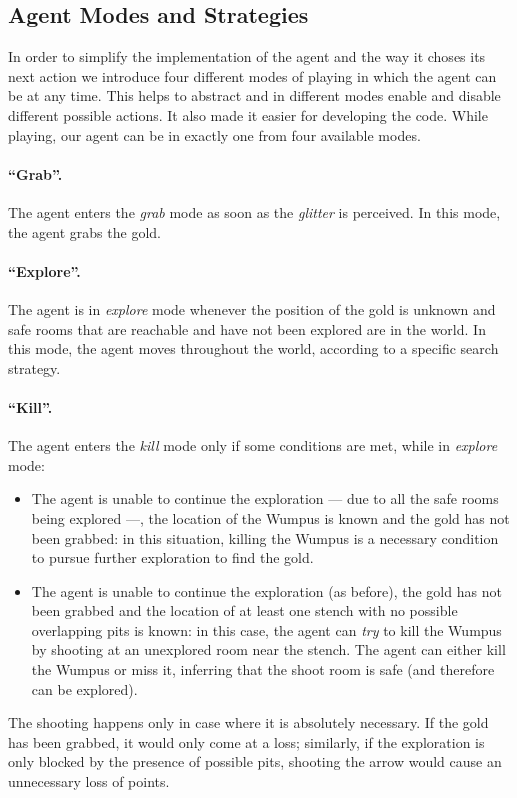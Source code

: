 \documentclass{llncs}
\begin{document}
\subsection{Agent Modes and Strategies}

In order to simplify the implementation of the agent and the way it choses its next action we introduce four different modes of playing in which the agent can be at any time. This helps to abstract and in different modes enable and disable different possible actions. It also made it easier for developing the code. 
While playing, our agent can be in exactly one from four available modes.

\paragraph{\enquote{Grab}.} The agent enters the \emph{grab} mode as soon as the \emph{glitter} is perceived. In this mode, the agent grabs the gold.

\paragraph{\enquote{Explore}.} The agent is in \emph{explore} mode whenever the position of the gold is unknown and safe rooms that are reachable and have not been explored are in the world.
In this mode, the agent moves throughout the world, according to a specific search strategy.

\paragraph{\enquote{Kill}.} The agent enters the \emph{kill} mode only if some conditions are met, while in \emph{explore} mode:
\begin{itemize}
	\item The agent is unable to continue the exploration --- due to all the safe rooms being explored ---, the location of the Wumpus is known and the gold has not been grabbed: in this situation, killing the Wumpus is a necessary condition to pursue further exploration to find the gold.
	\item The agent is unable to continue the exploration (as before), the gold has not been grabbed and the location of at least one stench with no possible overlapping pits is known: in this case, the agent can \emph{try} to kill the Wumpus by shooting at an unexplored room near the stench.
	The agent can either kill the Wumpus or miss it, inferring that the shoot room is safe (and therefore can be explored).
\end{itemize}
The shooting happens only in case where it is absolutely necessary.
If the gold has been grabbed, it would only come at a loss; similarly, if the exploration is only blocked by the presence of possible pits, shooting the arrow would cause an unnecessary loss of points.
\end{document}
